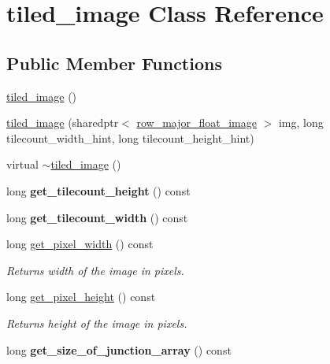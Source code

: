 \hypertarget{classtiled__image}{\section{tiled\-\_\-image Class Reference}
\label{classtiled__image}
}
\subsection*{Public Member Functions}
\begin{DoxyCompactItemize}
\item 
\hyperlink{classtiled__image_af727a95048112cced08bc7ee2a440010}{tiled\-\_\-image} ()
\item 
\hyperlink{classtiled__image_a6480c34f45160649875a7b07900a2319}{tiled\-\_\-image} (sharedptr$<$ \hyperlink{classrow__major__float__image}{row\-\_\-major\-\_\-float\-\_\-image} $>$ img, long tilecount\-\_\-width\-\_\-hint, long tilecount\-\_\-height\-\_\-hint)
\item 
virtual \hyperlink{classtiled__image_a20772dac65234d65049af89fa5b58472}{$\sim$tiled\-\_\-image} ()
\item 
\hypertarget{classtiled__image_a835c6244b693c7038f8141ff27e8fe39}{long {\bfseries get\-\_\-tilecount\-\_\-height} () const }\label{classtiled__image_a835c6244b693c7038f8141ff27e8fe39}

\item 
\hypertarget{classtiled__image_af7792839436444757c2f1b64f7c347cd}{long {\bfseries get\-\_\-tilecount\-\_\-width} () const }\label{classtiled__image_af7792839436444757c2f1b64f7c347cd}

\item 
\hypertarget{classtiled__image_a3a8cd506fb2a095e799236b8c0c4ac46}{long \hyperlink{classtiled__image_a3a8cd506fb2a095e799236b8c0c4ac46}{get\-\_\-pixel\-\_\-width} () const }\label{classtiled__image_a3a8cd506fb2a095e799236b8c0c4ac46}

\begin{DoxyCompactList}\small\item\em Returns width of the image in pixels. \end{DoxyCompactList}\item 
\hypertarget{classtiled__image_a1e9c9f6e7a99b092778d4f235a4fb460}{long \hyperlink{classtiled__image_a1e9c9f6e7a99b092778d4f235a4fb460}{get\-\_\-pixel\-\_\-height} () const }\label{classtiled__image_a1e9c9f6e7a99b092778d4f235a4fb460}

\begin{DoxyCompactList}\small\item\em Returns height of the image in pixels. \end{DoxyCompactList}\item 
\hypertarget{classtiled__image_a04bc77f4cc78651b1afc6a7cb2607cab}{long {\bfseries get\-\_\-size\-\_\-of\-\_\-junction\-\_\-array} () const }\label{classtiled__image_a04bc77f4cc78651b1afc6a7cb2607cab}


\end{DoxyCompactItemize}

